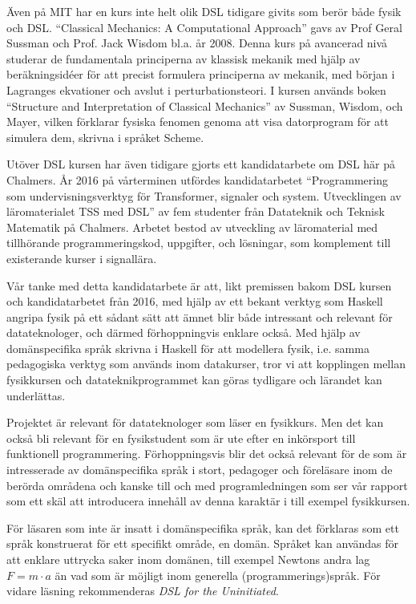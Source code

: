 \documentclass[12pt,a4paper]{article}
\begin{document}
Även på MIT har en kurs inte helt olik DSL tidigare givits som berör både fysik
och DSL. ``Classical Mechanics: A Computational Approach'' gavs av
Prof Geral Sussman och Prof. Jack Wisdom bl.a. år
2008.\cite{classical-mechanics-course-mit-2008}
Denna kurs på avancerad nivå studerar de fundamentala principerna av klassisk mekanik
med hjälp av beräkningsidéer för att precist formulera principerna av
mekanik, med början i Lagranges ekvationer och avslut i
perturbationsteori. I kursen används boken ``Structure and
Interpretation of Classical Mechanics'' av Sussman, Wisdom, och Mayer,
vilken förklarar fysiska fenomen genoma att visa datorprogram för att
simulera dem, skrivna i språket Scheme.\cite{SICM}

Utöver DSL kursen har även tidigare gjorts ett kandidatarbete om DSL
här på Chalmers. År 2016 på vårterminen utfördes kandidatarbetet
``Programmering som undervisningsverktyg för Transformer, signaler och
system. Utvecklingen av läromaterialet TSS med DSL'' av fem studenter
från Datateknik och Teknisk Matematik på Chalmers. Arbetet bestod av
utveckling av läromaterial med tillhörande programmeringskod,
uppgifter, och lösningar, som komplement till existerande kurser i
signallära.\cite{kandidat2016}

Vår tanke med detta kandidatarbete är att, likt premissen bakom DSL
kursen och kandidatarbetet från 2016, med hjälp av ett bekant verktyg
som Haskell angripa fysik på ett sådant sätt att ämnet blir både
intressant och relevant för datateknologer, och därmed förhoppningvis
enklare också. Med hjälp av domänspecifika språk skrivna i Haskell för att
modellera fysik, i.e. samma pedagogiska verktyg som används inom
datakurser, tror vi att kopplingen mellan fysikkursen och
datateknikprogrammet kan göras tydligare och lärandet kan underlättas.

Projektet är relevant för datateknologer som läser en fysikkurs. Men
det kan också bli relevant för en fysikstudent som är ute efter en
inkörsport till funktionell programmering. Förhoppningsvis blir det
också relevant för de som är intresserade av domänspecifika språk i
stort, pedagoger och föreläsare inom de berörda områdena och kanske
till och med programledningen som ser vår rapport som ett skäl att
introducera innehåll av denna karaktär i till exempel fysikkursen.

För läsaren som inte är insatt i domänspecifika språk, kan det
förklaras som ett språk konstruerat för ett specifikt område, en
domän. Språket kan användas för att enklare uttrycka saker inom
domänen, till exempel Newtons andra lag $F=m \cdot a$ än vad som är
möjligt inom generella (programmerings)språk. För vidare läsning
rekommenderas \textit{DSL for the Uninitiated}.\cite{DSLU}
\end{document}
